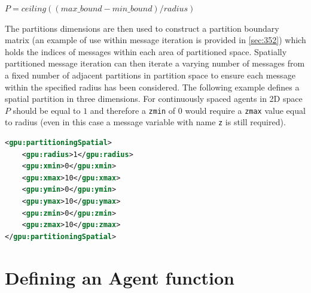 \documentclass[11pt, a4paper, onecolumn, oneside]{report}
\begin{document}
$P = ceiling((max\_bound - min\_bound) / radius)$

The partitions dimensions are then used to construct a partition boundary matrix (an example of use within message iteration is provided in \cref{sec:352}) which holds the indices of messages within each area of partitioned space.
Spatially partitioned message iteration can then iterate a varying number of messages from a fixed number of adjacent partitions in partition space to ensure each message within the specified radius has been considered.
The following example defines a spatial partition in three dimensions.
For continuously spaced agents in 2D space $P$ should be equal to $1$ and therefore a \texttt{zmin} of $0$ would require a \texttt{zmax} value equal to radius (even in this case a message variable with name \texttt{z} is still required).

\begin{lstlisting}[language=XML]
<gpu:partitioningSpatial>
    <gpu:radius>1</gpu:radius>
    <gpu:xmin>0</gpu:xmin>
    <gpu:xmax>10</gpu:xmax>
    <gpu:ymin>0</gpu:ymin>
    <gpu:ymax>10</gpu:ymax>
    <gpu:zmin>0</gpu:zmin>
    <gpu:zmax>10</gpu:zmax>
</gpu:partitioningSpatial>
\end{lstlisting}



\section{Defining an Agent function}
\label{sec:25}
\end{document}
